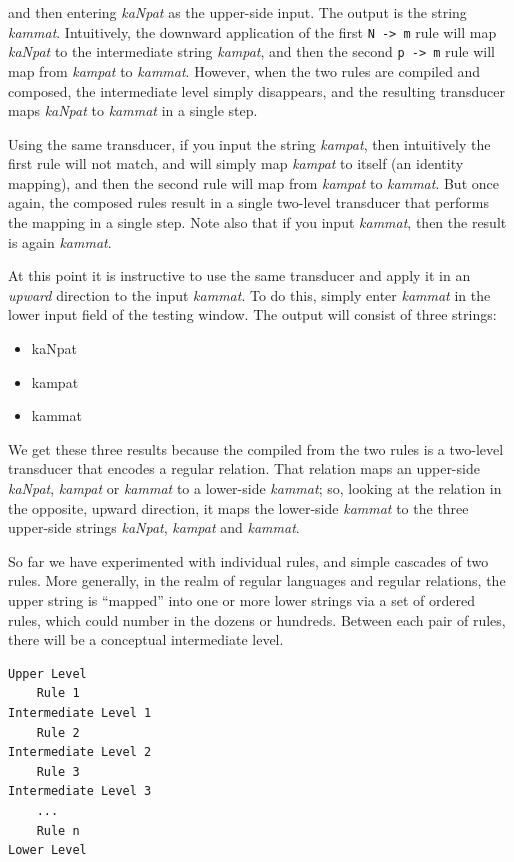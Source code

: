 \noindent
and then entering \emph{kaNpat} as the upper-side input.  The output is the string
\emph{kammat}.  Intuitively, the downward application of the first \texttt{N ->
m} rule will map \emph{kaNpat} to the intermediate string \emph{kampat}, and then
the second \texttt{p -> m} rule will map from \emph{kampat} to \emph{kammat}.
However, when the two rules are compiled and composed, the
intermediate level simply disappears, and the resulting transducer maps \emph{kaNpat} to
\emph{kammat} in a single step.

Using the same transducer, if
you input the string \emph{kampat}, then intuitively the first rule will not match, and
will simply map \emph{kampat} to itself (an identity mapping), and then the second
rule will map from \emph{kampat} to \emph{kammat}.  But once again, the composed
rules result in a single two-level transducer that performs the mapping in a
single step.  Note also that if you input \emph{kammat}, then the result is again
\emph{kammat}.

At this point it is instructive to use the same transducer and apply it in an
\emph{upward} direction to the input \emph{kammat}.  To do this, simply enter
\emph{kammat} in the lower input field of the testing window.  The output will
consist of three strings:

\begin{itemize}
\item
kaNpat
\item
kampat
\item
kammat
\end{itemize}

\noindent
We get these three results because the \fst{} compiled from the two rules is a
two-level transducer that encodes a regular relation.  That relation maps an
upper-side \emph{kaNpat}, \emph{kampat} or \emph{kammat} to a lower-side
\emph{kammat}; so, looking at the relation in the opposite, upward direction, it maps the
lower-side \emph{kammat} to the three upper-side strings \emph{kaNpat}, \emph{kampat}
and \emph{kammat}.

So far we have experimented with individual rules, and simple cascades of two rules.
More generally, in the realm of regular languages and
regular relations, the upper string  is ``mapped'' into one or more 
lower strings via a set of ordered rules, which could number in the dozens or hundreds.  Between each
pair of rules, there will be a conceptual intermediate level.


\begin{Verbatim}
Upper Level
    Rule 1
Intermediate Level 1
    Rule 2
Intermediate Level 2
    Rule 3
Intermediate Level 3
    ...
    Rule n
Lower Level
\end{Verbatim}

